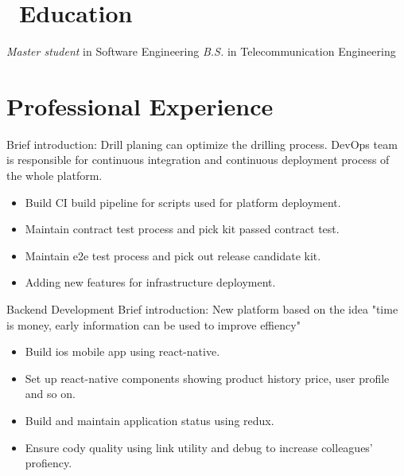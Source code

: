 \documentclass{resume}
\begin{document}



\section{\faGraduationCap\ Education}
\textit{Master student} in Software Engineering
\textit{B.S.} in Telecommunication Engineering

\section{Professional Experience}

Brief introduction: Drill planing can optimize the drilling process. DevOps team is responsible for continuous integration and continuous deployment process of the whole platform. 
\begin{itemize}
  \item Build CI build pipeline for scripts used for platform deployment.
  \item Maintain contract test process and pick kit passed contract test.
  \item Maintain e2e test process and pick out release candidate kit.
  \item Adding new features for infrastructure deployment.
\end{itemize}

 {Backend Development}
Brief introduction: New platform based on the idea "time is money, early information can be used to improve effiency" 
\begin{itemize}
  \item Build ios mobile app using react-native. 
  \item Set up react-native components showing product history price, user profile and so on.
  \item Build and maintain application status using redux.
  \item Ensure cody quality using link utility and debug to increase colleagues' profiency.
\end{itemize}
\end{document}
